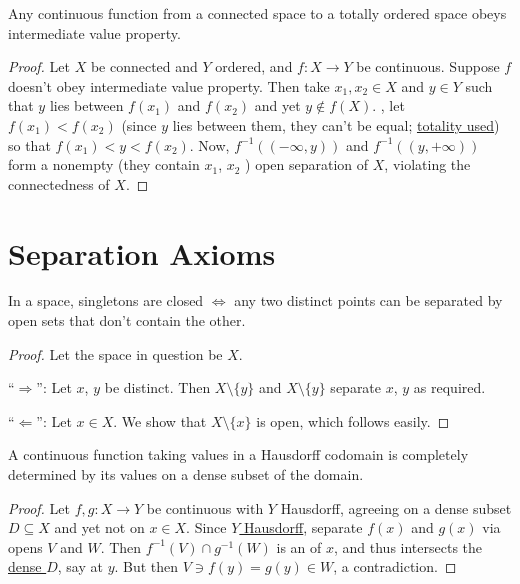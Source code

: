 	
	\begin{prp}
		Any continuous function from a connected space to a totally ordered space obeys intermediate value property.
	\end{prp}
	
	\begin{proof}
		Let $X$ be connected and $Y$ ordered, and $f\colon X\to Y$ be continuous. Suppose $f$ doesn't obey intermediate value property. Then take $x_1, x_2\in X$ and $y\in Y$ such that $y$ lies between $f(x_1)$ and $f(x_2)$ and yet $y\notin f(X)$. \Wlogg, let $f(x_1) < f(x_2)$ (since $y$ lies between them, they can't be equal; \uline{totality used}) so that $f(x_1) < y < f(x_2)$. Now, $f^{-1}((-\infty, y))$ and $f^{-1}((y, +\infty))$ form a nonempty (they contain $x_1$, $x_2$ \resp) open separation of $X$, violating the connectedness of $X$.
	\end{proof}
	
	
	
	

\section{Separation Axioms}

	\begin{lem}[$T_1$ spaces]\label{LEM: t1 spaces}
		In a space, singletons are closed $\iff$ any two distinct points can be separated by open sets that don't contain the other.
	\end{lem}
	
	\begin{proof}
		Let the space in question be $X$.
		
		``$\Rightarrow$'': Let $x$, $y$ be distinct. Then $X\setminus\{y\}$ and $X\setminus\{y\}$ separate $x$, $y$ as required.
		
		``$\Leftarrow$'': Let $x\in X$. We show that $X\setminus\{x\}$ is open, which follows easily.
	\end{proof}
	

	\begin{prp}\label{PRP: cont func into Hausdorff uniquely by its vals on dense subset}
		A continuous function taking values in a Hausdorff codomain is completely determined by its values on a dense subset of the domain.
	\end{prp}
	
	\begin{proof}
		Let $f, g\colon X\to Y$ be continuous with $Y$ Hausdorff, agreeing on a dense subset $D\subseteq X$ and yet not on $x\in X$. Since \uline{$Y$ Hausdorff}, separate $f(x)$ and $g(x)$ via opens $V$ and $W$. Then $f^{-1}(V)\cap g^{-1}(W)$ is an \onbd of $x$, and thus intersects the \uline{dense $D$}, say at $y$. But then $V\ni f(y) = g(y)\in W$, a contradiction.
	\end{proof}
	
